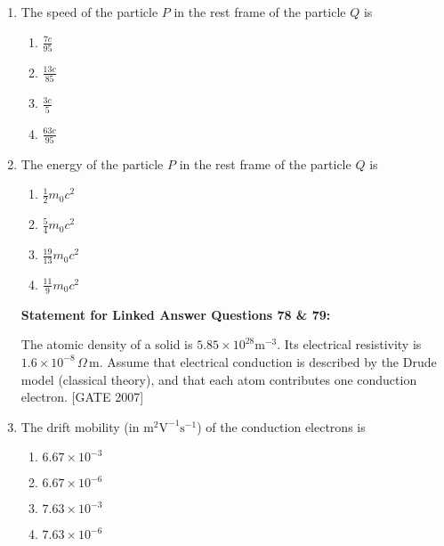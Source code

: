 \documentclass[journal,12pt,onecolumn]{IEEEtran}
\theoremstyle{remark}
\begin{document}
\begin{enumerate}
    \item  The speed of the particle $P$ in the rest frame of the particle $Q$ is
    \begin{multicols}{4}
    \begin{enumerate}
        \item $\frac{7c}{95}$
        \item $\frac{13c}{85}$
        \item $\frac{3c}{5}$
        \item $\frac{63c}{95}$
    \end{enumerate}
    \end{multicols}

    \item  The energy of the particle $P$ in the rest frame of the particle $Q$ is
    \begin{multicols}{4}
    \begin{enumerate}
        \item $\frac{1}{2} m_0 c^2$
        \item $\frac{5}{4} m_0 c^2$
        \item $\frac{19}{13} m_0 c^2$
        \item $\frac{11}{9} m_0 c^2$
    \end{enumerate}
    \end{multicols}


\bigskip

\textbf{Statement for Linked Answer Questions 78 \& 79:}

The atomic density of a solid is $5.85 \times 10^{28} \text{m}^{-3}$. Its electrical resistivity is $1.6 \times 10^{-8} \, \Omega \, \text{m}$. Assume that electrical conduction is described by the Drude model (classical theory), and that each atom contributes one conduction electron.  \hfill{[GATE 2007]}


    \item The drift mobility (in $\text{m}^2 \text{V}^{-1} \text{s}^{-1}$) of the conduction electrons is
    \begin{multicols}{4}
    \begin{enumerate}
        \item $6.67 \times 10^{-3}$
        \item $6.67 \times 10^{-6}$
        \item $7.63 \times 10^{-3}$
        \item $7.63 \times 10^{-6}$
    \end{enumerate}
    \end{multicols}


\end{enumerate}
\end{document}
